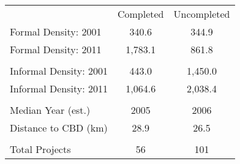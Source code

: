 \begin{tabu}{lcc}
 & Completed & Uncompleted \\ 
 Formal Density: 2001  & 340.6  & 344.9  \\ 
 Formal Density: 2011  & 1,783.1  & 861.8  \\ 
 &  &  \\ 
 Informal Density: 2001  & 443.0  & 1,450.0  \\ 
 Informal Density: 2011  & 1,064.6  & 2,038.4  \\ 
 &  &  \\ 
 Median Year (est.)  & 2005  & 2006  \\ 
 Distance to CBD (km)  & 28.9  & 26.5  \\ 
 &  &  \\ 
 Total Projects   & 56  & 101  \\ 
\bottomrule
\end{tabu}
